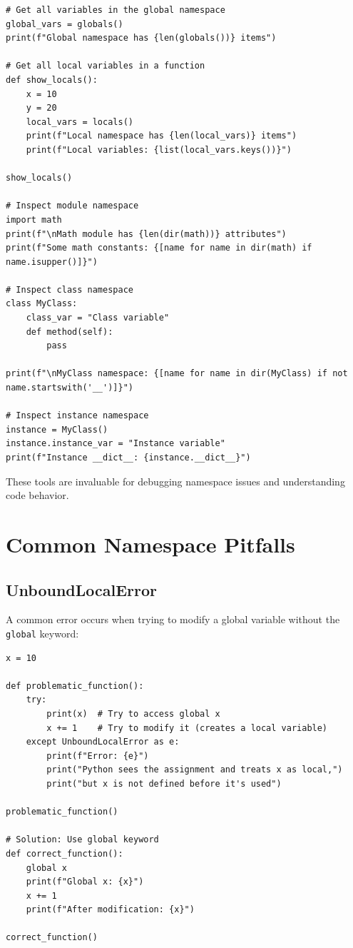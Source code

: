 \documentclass[12pt,letterpaper]{article}
\newenvironment{macterminal}{%
    \begin{mdframed}[
        linecolor=terminalFrame,
        backgroundcolor=terminalBg,
        roundcorner=5pt,
        skipabove=10pt,
        skipbelow=10pt,
        linewidth=1pt,
        innertopmargin=10pt, %
        frametitle={%
            \tikz[baseline=(current bounding box.east), outer sep=0pt]{
                \fill[red!80!black] (0,0) circle (5pt);
                \fill[yellow!80!black] (0.7,0) circle (5pt);
                \fill[green!70!black] (1.4,0) circle (5pt);
            }
        },
        frametitlealignment=\raggedright, %
        frametitleaboveskip=8pt, %
        frametitlebelowskip=0pt, %
    ]
}{%
    \end{mdframed}%
}
\begin{document}
\begin{macterminal}
\begin{lstlisting}
# Get all variables in the global namespace
global_vars = globals()
print(f"Global namespace has {len(globals())} items")

# Get all local variables in a function
def show_locals():
    x = 10
    y = 20
    local_vars = locals()
    print(f"Local namespace has {len(local_vars)} items")
    print(f"Local variables: {list(local_vars.keys())}")

show_locals()

# Inspect module namespace
import math
print(f"\nMath module has {len(dir(math))} attributes")
print(f"Some math constants: {[name for name in dir(math) if name.isupper()]}")

# Inspect class namespace
class MyClass:
    class_var = "Class variable"
    def method(self):
        pass

print(f"\nMyClass namespace: {[name for name in dir(MyClass) if not name.startswith('__')]}")

# Inspect instance namespace
instance = MyClass()
instance.instance_var = "Instance variable"
print(f"Instance __dict__: {instance.__dict__}")
\end{lstlisting}
\end{macterminal}

These tools are invaluable for debugging namespace issues and understanding code behavior.

\section{Common Namespace Pitfalls}

\subsection{UnboundLocalError}

A common error occurs when trying to modify a global variable without the \texttt{global} keyword:

\begin{macterminal}
\begin{lstlisting}
x = 10

def problematic_function():
    try:
        print(x)  # Try to access global x
        x += 1    # Try to modify it (creates a local variable)
    except UnboundLocalError as e:
        print(f"Error: {e}")
        print("Python sees the assignment and treats x as local,")
        print("but x is not defined before it's used")

problematic_function()

# Solution: Use global keyword
def correct_function():
    global x
    print(f"Global x: {x}")
    x += 1
    print(f"After modification: {x}")

correct_function()
\end{lstlisting}
\end{macterminal}
\end{document}
